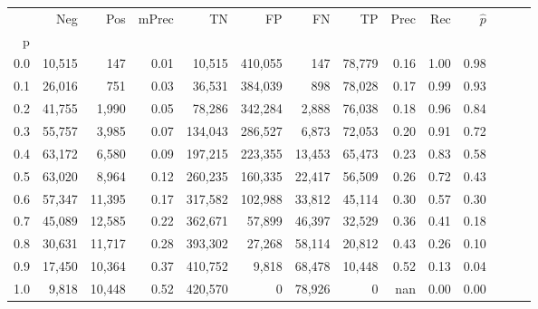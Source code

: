 \begin{tabular}{rrrrrrrrrrrrrr}
\toprule
{} &     Neg &     Pos & mPrec &       TN &       FP &      FN &      TP &  Prec &   Rec & $\hat{p}$ \\
p   &         &         &       &          &          &         &         &       &       &           \\
\midrule
0.0 &  10,515 &     147 &  0.01 &   10,515 &  410,055 &     147 &  78,779 &  0.16 &  1.00 &      0.98 \\
0.1 &  26,016 &     751 &  0.03 &   36,531 &  384,039 &     898 &  78,028 &  0.17 &  0.99 &      0.93 \\
0.2 &  41,755 &   1,990 &  0.05 &   78,286 &  342,284 &   2,888 &  76,038 &  0.18 &  0.96 &      0.84 \\
0.3 &  55,757 &   3,985 &  0.07 &  134,043 &  286,527 &   6,873 &  72,053 &  0.20 &  0.91 &      0.72 \\
0.4 &  63,172 &   6,580 &  0.09 &  197,215 &  223,355 &  13,453 &  65,473 &  0.23 &  0.83 &      0.58 \\
0.5 &  63,020 &   8,964 &  0.12 &  260,235 &  160,335 &  22,417 &  56,509 &  0.26 &  0.72 &      0.43 \\
0.6 &  57,347 &  11,395 &  0.17 &  317,582 &  102,988 &  33,812 &  45,114 &  0.30 &  0.57 &      0.30 \\
0.7 &  45,089 &  12,585 &  0.22 &  362,671 &   57,899 &  46,397 &  32,529 &  0.36 &  0.41 &      0.18 \\
0.8 &  30,631 &  11,717 &  0.28 &  393,302 &   27,268 &  58,114 &  20,812 &  0.43 &  0.26 &      0.10 \\
0.9 &  17,450 &  10,364 &  0.37 &  410,752 &    9,818 &  68,478 &  10,448 &  0.52 &  0.13 &      0.04 \\
1.0 &   9,818 &  10,448 &  0.52 &  420,570 &        0 &  78,926 &       0 &   nan &  0.00 &      0.00 \\
\bottomrule
\end{tabular}

